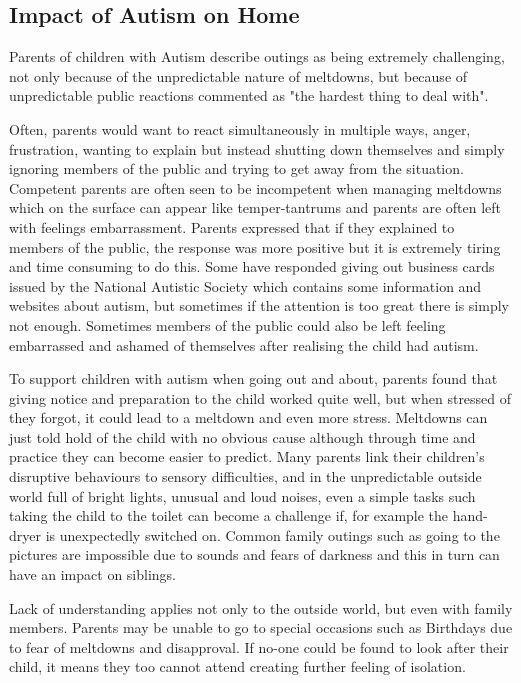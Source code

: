 \documentclass[11pt]{report}
\begin{document}
\subsection{Impact of Autism on Home}
Parents of children with Autism describe outings as being extremely challenging, not only because of the unpredictable nature of meltdowns, but because of unpredictable public reactions\cite{meltdowns_goingout} commented as "the hardest thing to deal with"\cite{meltdowns_goingout}.

Often, parents would want to react simultaneously in multiple ways, anger, frustration, wanting to explain but instead shutting down themselves and simply ignoring members of the public and trying to get away from the situation\cite{meltdowns_goingout}. Competent parents are often seen to be incompetent when managing meltdowns which on the surface can appear like temper-tantrums and parents are often left with feelings embarrassment\cite{meltdowns_goingout}. Parents expressed that if they explained to members of the public, the response was more positive but it is extremely tiring and time consuming to do this\cite{meltdowns_goingout}. Some have responded giving out business cards issued by the National Autistic Society which contains some information and websites about autism, but sometimes if the attention is too great there is simply not enough. Sometimes members of the public could also be left feeling embarrassed and ashamed of themselves after realising the child had autism\cite{meltdowns_goingout}.  

To support children with autism when going out and about, parents found that giving notice and preparation to the child worked quite well, but when stressed of they forgot, it could lead to a meltdown and even more stress\cite{meltdowns_goingout}. Meltdowns can just told hold of the child with no obvious cause although through time and practice they can become easier to predict. Many parents link their children's disruptive behaviours to sensory difficulties, and in the unpredictable outside world full of bright lights, unusual and loud noises, even a simple tasks such taking the child to the toilet can become a challenge if, for example the hand-dryer is unexpectedly switched on\cite{meltdowns_goingout}. Common family outings such as going to the pictures are impossible due to sounds and fears of darkness and this in turn can have an impact on siblings.  

Lack of understanding applies not only to the outside world, but even with family members\cite{meltdowns_goingout}. Parents may be unable to go to special occasions such as Birthdays due to fear of meltdowns and disapproval. If no-one could be found to look after their child, it means they too cannot attend creating further feeling of isolation.
\end{document}
